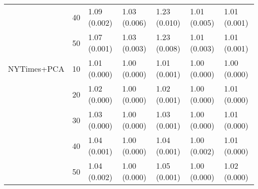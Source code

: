 \begin{table}[ht]
\begin{tabular}{lllllll}
      & 40  &   1.09 (0.002) &   1.03 (0.006) &   1.23 (0.010) &         1.01 (0.005) &  1.01 (0.001) \\
      & 50  &   1.07 (0.001) &   1.03 (0.003) &   1.23 (0.008) &         1.01 (0.003) &  1.01 (0.001) \\
\midrule
NYTimes+PCA & 10  &   1.01 (0.000) &   1.00 (0.000) &   1.01 (0.001) &         1.00 (0.000) &  1.00 (0.000) \\
      & 20  &   1.02 (0.000) &   1.00 (0.000) &   1.02 (0.001) &         1.00 (0.000) &  1.01 (0.000) \\
      & 30  &   1.03 (0.000) &   1.00 (0.000) &   1.03 (0.001) &         1.00 (0.000) &  1.01 (0.000) \\
      & 40  &   1.04 (0.001) &   1.00 (0.000) &   1.04 (0.001) &         1.00 (0.002) &  1.01 (0.000) \\
      & 50  &   1.04 (0.002) &   1.00 (0.000) &   1.05 (0.001) &         1.00 (0.000) &  1.02 (0.000) \\
\bottomrule
\end{tabular}

\end{table}



